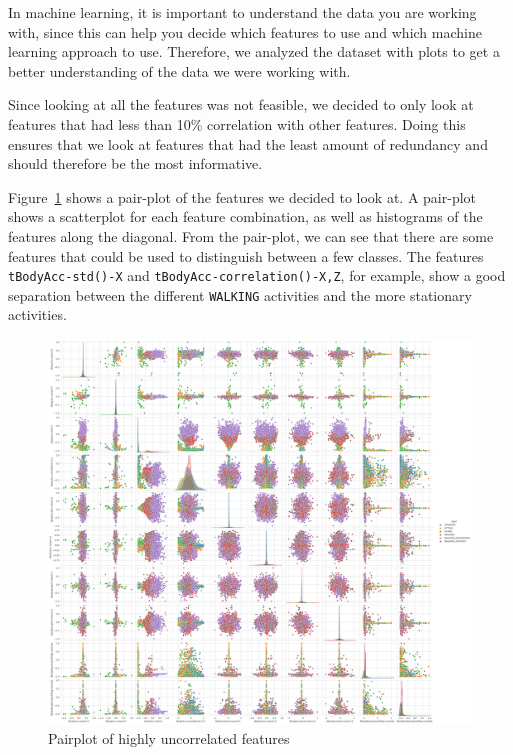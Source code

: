 In machine learning, it is important to understand the data you are working with, since this can help you decide which features to use and which machine learning approach to use.
Therefore, we analyzed the dataset with plots to get a better understanding of the data we were working with.

Since looking at all the features was not feasible, we decided to only look at features that had less than 10\% correlation with other features.
Doing this ensures that we look at features that had the least amount of redundancy and should therefore be the most informative.

Figure~\ref{fig:pairplot} shows a pair-plot of the features we decided to look at.
A pair-plot shows a scatterplot for each feature combination, as well as histograms of the features along the diagonal.
From the pair-plot, we can see that there are some features that could be used to distinguish between a few classes.
The features \texttt{tBodyAcc-std()-X} and \texttt{tBodyAcc-correlation()-X,Z}, for example, show a good separation between the different \texttt{WALKING} activities and the more stationary activities.

\begin{figure}[ht]
    \centering
    \includegraphics[width=\textwidth]{./img/pairplot}
    \caption{Pairplot of highly uncorrelated features}
    \label{fig:pairplot}
\end{figure}

